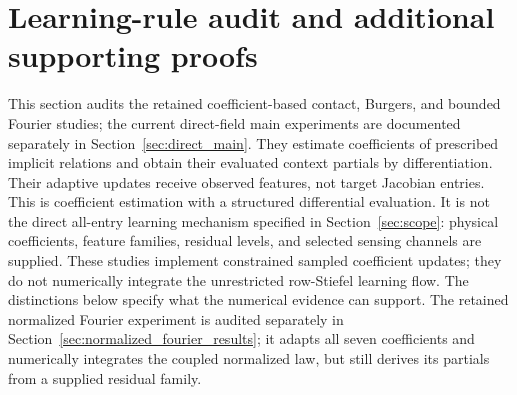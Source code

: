 \newtheorem{auditproposition}{Proposition}
\renewcommand{\theauditproposition}{S.A\arabic{auditproposition}}

\section{Learning-rule audit and additional supporting proofs}
\label{sec:learning_rule_audit}

This section audits the retained coefficient-based contact, Burgers, and
bounded Fourier studies; the current direct-field main experiments are
documented separately in Section~\ref{sec:direct_main}.
They estimate coefficients of prescribed implicit relations
and obtain their evaluated context partials by differentiation. Their adaptive
updates receive observed features, not target Jacobian entries. This is
coefficient estimation with a structured differential evaluation. It is
not the direct all-entry learning mechanism specified in
Section~\ref{sec:scope}: physical
coefficients, feature families, residual levels, and selected sensing channels
are supplied. These studies implement constrained sampled
coefficient updates; they do not numerically integrate the unrestricted
row-Stiefel learning flow. The distinctions below specify what the numerical
evidence can support. The retained normalized Fourier experiment is audited
separately in Section~\ref{sec:normalized_fourier_results}; it adapts all
seven coefficients and numerically integrates the coupled normalized law,
but still derives its partials from a supplied residual family.

